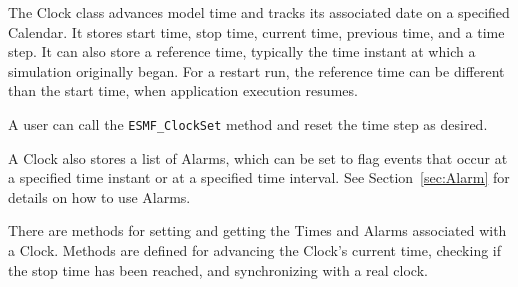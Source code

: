 
\label{sec:Clock}

The Clock class advances model time and tracks its associated
date on a specified Calendar.  It stores start time, stop time,
current time, previous time, and a time step.  It can also store
a reference time, typically the time instant at which a simulation 
originally began.  For a restart run, the reference time can be 
different than the start time, when application execution resumes.

A user can call the {\tt ESMF\_ClockSet} method and reset the time 
step as desired.  

A Clock also stores a list of Alarms, which can be set to flag 
events that occur at a specified time instant or at 
a specified time interval.  See Section~\ref{sec:Alarm} for 
details on how to use Alarms.

There are methods for setting and getting the Times and 
Alarms associated with a Clock.  Methods are defined for 
advancing the Clock's current time, checking if the
stop time has been reached, and synchronizing with a real clock. 

